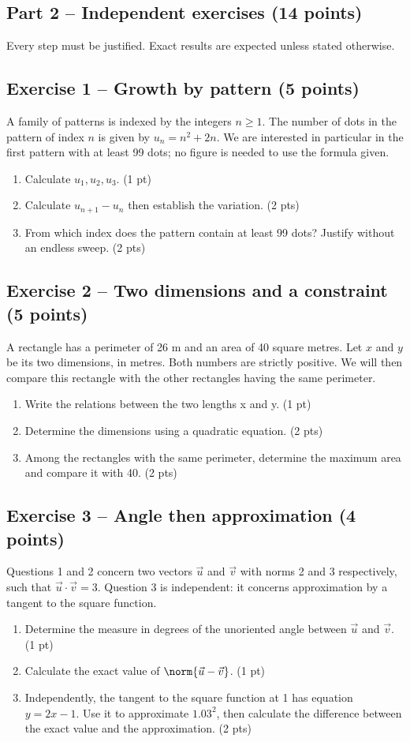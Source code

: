 \clearpage\subsection*{Part 2 -- Independent exercises (14 points)}
Every step must be justified. Exact results are expected unless stated otherwise.
\subsection*{Exercise 1 -- Growth by pattern (5 points)}
A family of patterns is indexed by the integers $n\geq1$. The number of dots in the pattern of index $n$ is given by $u_n=n^2+2n$. We are interested in particular in the first pattern with at least 99 dots; no figure is needed to use the formula given.
\begin{enumerate}
\item Calculate $u_1,u_2,u_3$. \hfill(1 pt)
\item Calculate $u_{n+1}-u_n$ then establish the variation. \hfill(2 pts)
\item From which index does the pattern contain at least 99 dots? Justify without an endless sweep. \hfill(2 pts)
\end{enumerate}
\subsection*{Exercise 2 -- Two dimensions and a constraint (5 points)}
A rectangle has a perimeter of 26 m and an area of 40 square metres. Let $x$ and $y$ be its two dimensions, in metres. Both numbers are strictly positive. We will then compare this rectangle with the other rectangles having the same perimeter.
\begin{enumerate}
\item Write the relations between the two lengths x and y. \hfill(1 pt)
\item Determine the dimensions using a quadratic equation. \hfill(2 pts)
\item Among the rectangles with the same perimeter, determine the maximum area and compare it with 40. \hfill(2 pts)
\end{enumerate}
\subsection*{Exercise 3 -- Angle then approximation (4 points)}
Questions 1 and 2 concern two vectors $\vec u$ and $\vec v$ with norms 2 and 3 respectively, such that $\vec u\cdot\vec v=3$. Question 3 is independent: it concerns approximation by a tangent to the square function.
\begin{enumerate}
\item Determine the measure in degrees of the unoriented angle between $\vec u$ and $\vec v$. \hfill(1 pt)
\item Calculate the exact value of $\norm{\vec u-\vec v}$. \hfill(1 pt)
\item Independently, the tangent to the square function at 1 has equation $y=2x-1$. Use it to approximate $1.03^2$, then calculate the difference between the exact value and the approximation. \hfill(2 pts)
\end{enumerate}
